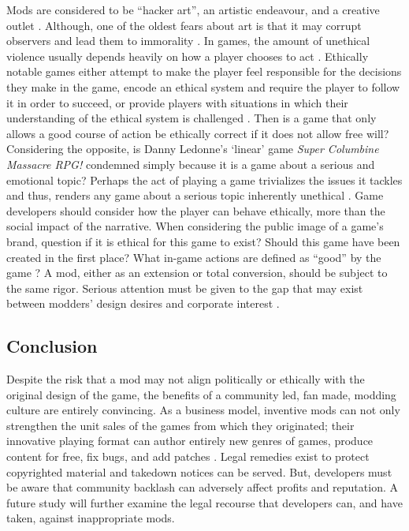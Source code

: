 \documentclass{scrartcl}
\begin{document}
Mods are considered to be ``hacker art'', an artistic endeavour, and a creative outlet \cite{sotamaa2010game}. Although, one of the oldest fears about art is that it may corrupt observers and lead them to immorality \cite{schulzke2009moral}. In games, the amount of unethical violence usually depends heavily on how a player chooses to act \cite{schulzke2010defending}. Ethically notable games either attempt to make the player feel responsible for the decisions they make in the game, encode an ethical system and require the player to follow it in order to succeed, or provide players with situations in which their understanding of the ethical system is challenged \cite{zagal2009ethically}. Then is a game that only allows a good course of action be ethically correct if it does not allow free will? Considering the opposite, is Danny Ledonne's `linear' game \textit{Super Columbine Massacre RPG!} condemned simply because it is a game about a serious and emotional topic? Perhaps the act of playing a game trivializes the issues it tackles and thus, renders any game about a serious topic inherently unethical \cite{zagal2009ethically}. Game developers should consider how the player can behave ethically, more than the social impact of the narrative. When considering the public image of a game's brand, question if it is ethical for this game to exist? Should this game have been created in the first place? What in-game actions are defined as ``good'' by the game \cite{zagal2009ethically}? A mod, either as an extension or total conversion, should be subject to the same rigor. Serious attention must be given to the gap that may exist between modders' design desires and corporate interest \cite{taylor2002whose}.

\subsection*{Conclusion}

Despite the risk that a mod may not align politically or ethically with the original design of the game, the benefits of a community led, fan made, modding culture are entirely convincing. As a business model, inventive mods can not only strengthen the unit sales of the games from which they originated; their innovative playing format can author entirely new genres of games, produce content for free, fix bugs, and add patches \cite{hong2014becoming}.  Legal remedies exist to protect copyrighted material \cite{copyright1988} \cite{trademarks1994} and takedown notices can be served. But, developers must be aware that community backlash can adversely affect profits and reputation. A future study will further examine the legal recourse that developers can, and have taken, against inappropriate mods.



\end{document}
